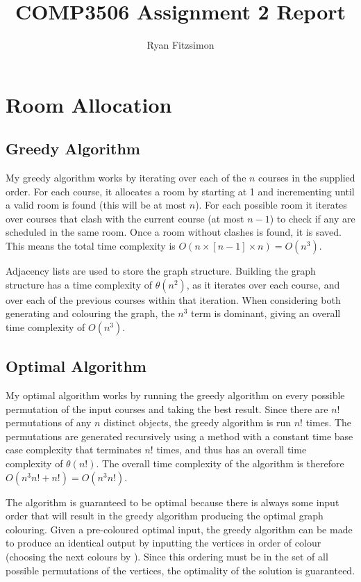 \documentclass[]{article}
\title{COMP3506 Assignment 2 Report}
\author{Ryan Fitzsimon}
\begin{document}
\maketitle

\section{Room Allocation}
\subsection{Greedy Algorithm}
My greedy algorithm works by iterating over each of the $n$ courses in the supplied order. For each course, it allocates a room by starting at 1 and incrementing until a valid room is found (this will be at most $n$). For each possible room it iterates over courses that clash with the current course (at most $n - 1$) to check if any are scheduled in the same room. Once a room without clashes is found, it is saved. This means the total time complexity is $O(n\times[n-1]\times n)=O(n^3)$.

Adjacency lists are used to store the graph structure. Building the graph structure has a time complexity of $\theta(n^2)$, as it iterates over each course, and over each of the previous courses within that iteration. When considering both generating and colouring the graph, the $n^3$ term is dominant, giving an overall time complexity of $O(n^3)$.

\subsection{Optimal Algorithm}
My optimal algorithm works by running the greedy algorithm on every possible permutation of the input courses and taking the best result. Since there are $n!$ permutations of any $n$ distinct objects, the greedy algorithm is run $n!$ times. The permutations are generated recursively using a method with a constant time base case complexity that terminates $n!$ times, and thus has an overall time complexity of $\theta(n!)$. The overall time complexity of the algorithm is therefore $O(n^3n! + n!) = O(n^3n!)$.

The algorithm is guaranteed to be optimal because there is always some input order that will result in the greedy algorithm producing the optimal graph colouring. Given a pre-coloured optimal input, the greedy algorithm can be made to produce an identical output by inputting the vertices in order of colour (choosing the next colours by ). Since this ordering must be in the set of all possible permutations of the vertices, the optimality of the solution is guaranteed.
\end{document}

